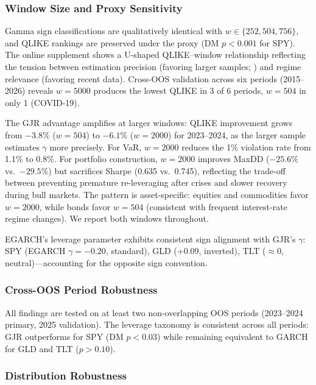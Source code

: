 \subsubsection{Window Size and Proxy Sensitivity}

Gamma sign classifications are qualitatively identical with $w \in \{252, 504, 756\}$, and QLIKE rankings are preserved under the \citet{parkinson1980} proxy (DM $p < 0.001$ for SPY). The online supplement shows a U-shaped QLIKE--window relationship reflecting the tension between estimation precision (favoring larger samples; \citealt{hwang2006}) and regime relevance (favoring recent data). Cross-OOS validation across six periods (2015--2026) reveals $w = 5000$ produces the lowest QLIKE in 3 of 6 periods, $w = 504$ in only 1 (COVID-19).

The GJR advantage amplifies at larger windows: QLIKE improvement grows from $-3.8\%$ ($w = 504$) to $-6.1\%$ ($w = 2000$) for 2023--2024, as the larger sample estimates $\gamma$ more precisely. For VaR, $w = 2000$ reduces the 1\% violation rate from 1.1\% to 0.8\%. For portfolio construction, $w = 2000$ improves MaxDD ($-25.6\%$ vs.\ $-29.5\%$) but sacrifices Sharpe (0.635 vs.\ 0.745), reflecting the trade-off between preventing premature re-leveraging after crises and slower recovery during bull markets. The pattern is asset-specific: equities and commodities favor $w = 2000$, while bonds favor $w = 504$ (consistent with frequent interest-rate regime changes). We report both windows throughout.

EGARCH's leverage parameter exhibits consistent sign alignment with GJR's $\gamma$: SPY (EGARCH $\gamma = -0.20$, standard), GLD (+0.09, inverted), TLT ($\approx 0$, neutral)---accounting for the opposite sign convention.

\subsubsection{Cross-OOS Period Robustness}

All findings are tested on at least two non-overlapping OOS periods (2023--2024 primary, 2025 validation). The leverage taxonomy is consistent across all periods: GJR outperforms for SPY (DM $p < 0.03$) while remaining equivalent to GARCH for GLD and TLT ($p > 0.10$).

\subsubsection{Distribution Robustness}

